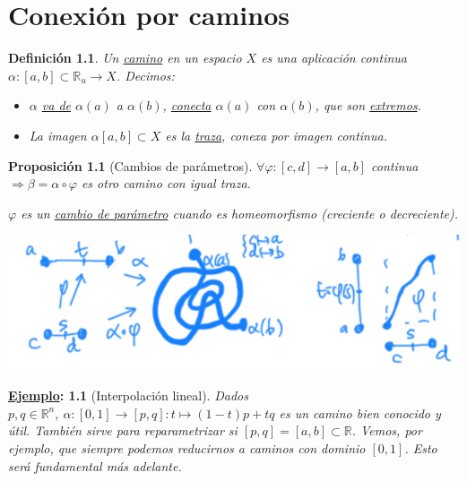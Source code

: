 \documentclass[10pt,a4paper,openright]{book}
\theoremstyle{break}
\newtheorem*{defi}{Definición}
\newtheorem*{prop}{Proposición}
\newtheorem*{ej}{\underline{Ejemplo}:}
\begin{document}
\chapter{Conexión por caminos}%
\label{cha:conexion_por_caminos}
\begin{defi}
Un \underline{camino} en un espacio $X$ es una aplicación continua $\alpha: \left[ a, b \right] \subset \mathbb{R}_u \rightarrow X$. Decimos:
\begin{itemize}
    \item $\alpha$ \underline{va de} $\alpha\left( a \right)$ a $\alpha\left( b \right)$, \underline{conecta} $\alpha\left( a \right)$ con $\alpha\left( b \right)$, que son \underline{extremos}.
    \item La imagen $\alpha\left[ a, b \right] \subset X$ es la \underline{traza}, conexa por imagen continua.
\end{itemize}
\end{defi}

\begin{prop}[Cambios de parámetros]
$\forall \varphi: \left[ c, d \right] \rightarrow \left[ a, b \right]$ continua $\Rightarrow \beta = \alpha \circ \varphi$ es otro camino con igual traza.    

$\varphi$ es un \underline{cambio de parámetro} cuando es homeomorfismo (creciente o decreciente).
\begin{center}
    \includegraphics[scale=0.3]{images/camb_par_caminos} 
\end{center}
\end{prop}

\begin{ej}[Interpolación lineal]
Dados $p, q \in \mathbb{R}^n,\ \alpha : \left[ 0, 1 \right] \rightarrow \left[ p, q \right]: t \mapsto \left( 1 - t \right) p + tq$ es un camino bien conocido y útil. También sirve para reparametrizar si $\left[ p, q \right] = \left[ a, b \right] \subset \mathbb{R}$. Vemos, por ejemplo, que siempre podemos reducirnos a caminos con dominio $\left[ 0, 1 \right]$. Esto será fundamental más adelante. 
\end{ej}
\end{document}
